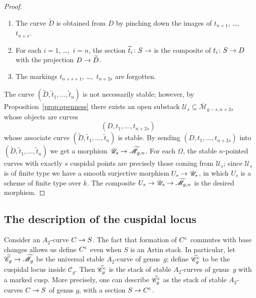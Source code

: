 \documentclass[a4paper, 10pt]{amsart}
\numberwithin{equation}{section}
\numberwithin{subsection}{section}
\newenvironment{enumerate1}
{\begin{enumerate}[\upshape (1)]}
	{\end{enumerate}}
\theoremstyle{definition}
\theoremstyle{remark}
\renewcommand{\mathcal}{\mathscr}
\newcommand\cC{\mathcal{C}} \newcommand\cD{\mathcal{D}}
\newcommand\cU{\mathcal{U}} \newcommand\cV{\mathcal{V}}
\newcommand\arr{\ifinner\to\else\longrightarrow\fi}
\newcommand{\Ctilde}{\widetilde{\mathcal C}}
\newcommand{\cu}{^{\rm c}}
\newcommand{\mbar}{\overline{\mathcal M}}
\newcommand{\mt}{\widetilde{\mathcal M}}
\begin{document}
\begin{proof}
		\begin{enumerate1}
			
			\item The curve $\widetilde{D}$ is obtained from $D$ by pinching down the images of $t_{n+1}$, \dots,~$t_{n+s}$.
			
			\item For each $i = 1$, \dots,~$i= n$, the section $\widetilde{t}_{i}\colon S \arr$ is the composite of $t_{i}\colon  S \arr D$ with the projection $D \arr \widetilde{D}$.
			
			\item The markings $t_{n+s+1}$, \dots,~$t_{n+2s}$ are forgotten.
			
		\end{enumerate1} 
		
		The curve $(\widetilde{D}, \widetilde{t}_{1}, \dots, \widetilde{t}_{n})$ is not necessarily stable; however, by Proposition~\ref{prop:openness} there exists an open substack $\cU_{s} \subseteq \mbar_{g-s, n+2s}$ whose objects are curves $$(D, t_{1}, \dots, t_{n+2s})$$ whose associate curve $(\widetilde{D}, \widetilde{t}_{1}, \dots, \widetilde{t}_{n})$ is stable. By sending $(D, t_{1}, \dots, t_{n+2s})$ into $(\widetilde{D}, \widetilde{t}_{1}, \dots, \widetilde{t}_{n})$ we get a morphism $\cU_{s} \arr \mt_{g,n}$. For each $\Omega$, the stable $n$-pointed curves with exactly $s$ cuspidal points are precisely those coming from $\cU_{s}$; since $\cU_{s}$ is of finite type we have a smooth surjective morphism $U_{s} \arr \cU_{s}$, in which $U_{s}$ is a scheme of finite type over $k$. The composite $U_{s} \arr \cU_{s} \arr \mt_{g, n}$ is the desired morphism.
	\end{proof}
	
	
	\subsection{The description of the cuspidal locus}\label{sub:description cusp} 
	Consider an $A_{2}$-curve $C \arr S$. The fact that formation of $C\cu$ commutes with base changes allows us define $C\cu$ even when $S$ is an Artin stack. In particular, let $\Ctilde_{g} \arr \mt_{g}$ be the universal stable $A_2$-curve of genus~$g$; define $\Ctilde\cu_g$ to be the cuspidal locus inside $\cC_{g}$. Then $\Ctilde\cu_{g}$ is the stack of stable $A_2$-curves of genus~$g$ with a marked cusp. More precisely, one can describe $\Ctilde\cu_{g}$ as the stack of stable $A_2$-curves $C \arr S$ of genus $g$, with a section $S \arr C\cu$.
	
\end{document}

